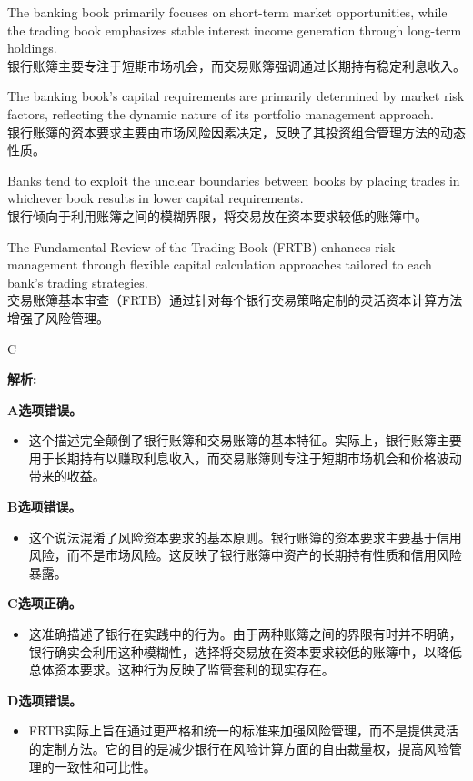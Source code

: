 \documentclass{article}
\newenvironment{explanation}
{\textbf{解析:}\par}
{\par}
\begin{document}
\begin{choices}
    \item The banking book primarily focuses on short-term market opportunities, while the trading book emphasizes stable interest income generation through long-term holdings.\\银行账簿主要专注于短期市场机会，而交易账簿强调通过长期持有稳定利息收入。
    \item The banking book's capital requirements are primarily determined by market risk factors, reflecting the dynamic nature of its portfolio management approach.\\银行账簿的资本要求主要由市场风险因素决定，反映了其投资组合管理方法的动态性质。
    \item Banks tend to exploit the unclear boundaries between books by placing trades in whichever book results in lower capital requirements.\\银行倾向于利用账簿之间的模糊界限，将交易放在资本要求较低的账簿中。
    \item The Fundamental Review of the Trading Book (FRTB) enhances risk management through flexible capital calculation approaches tailored to each bank's trading strategies.\\交易账簿基本审查（FRTB）通过针对每个银行交易策略定制的灵活资本计算方法增强了风险管理。
\end{choices}

\begin{correctanswer}
    C
\end{correctanswer}

\begin{explanation}
    \textbf{A选项错误。}
    \begin{itemize}
        \item 这个描述完全颠倒了银行账簿和交易账簿的基本特征。实际上，银行账簿主要用于长期持有以赚取利息收入，而交易账簿则专注于短期市场机会和价格波动带来的收益。
    \end{itemize}

    \textbf{B选项错误。}
    \begin{itemize}
        \item 这个说法混淆了风险资本要求的基本原则。银行账簿的资本要求主要基于信用风险，而不是市场风险。这反映了银行账簿中资产的长期持有性质和信用风险暴露。
    \end{itemize}

    \textbf{C选项正确。}
    \begin{itemize}
        \item 这准确描述了银行在实践中的行为。由于两种账簿之间的界限有时并不明确，银行确实会利用这种模糊性，选择将交易放在资本要求较低的账簿中，以降低总体资本要求。这种行为反映了监管套利的现实存在。
    \end{itemize}

    \textbf{D选项错误。}
    \begin{itemize}
        \item FRTB实际上旨在通过更严格和统一的标准来加强风险管理，而不是提供灵活的定制方法。它的目的是减少银行在风险计算方面的自由裁量权，提高风险管理的一致性和可比性。
    \end{itemize}
\end{explanation}
\end{document}
